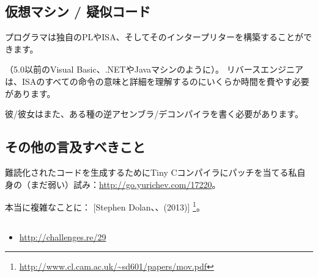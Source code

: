 \subsection{仮想マシン / 疑似コード}

プログラマは独自の\ac{PL}や\ac{ISA}、そしてそのインタープリターを構築することができます。

（5.0以前のVisual Basic、.NETやJavaマシンのように）。
リバースエンジニアは、\ac{ISA}のすべての命令の意味と詳細を理解するのにいくらか時間を費やす必要があります。

彼/彼女はまた、ある種の逆アセンブラ/デコンパイラを書く必要があります。

\subsection{その他の言及すべきこと}

難読化されたコードを生成するためにTiny Cコンパイラにパッチを当てる私自身の（まだ弱い）試み：\url{http://go.yurichev.com/17220}。

本当に複雑なことに：
[Stephen Dolan、、(2013)]
\footnote{\AlsoAvailableAs \url{http://www.cl.cam.ac.uk/~sd601/papers/mov.pdf}}。

\subsection{\Exercise}

\begin{itemize}
	\item \url{http://challenges.re/29}
\end{itemize}